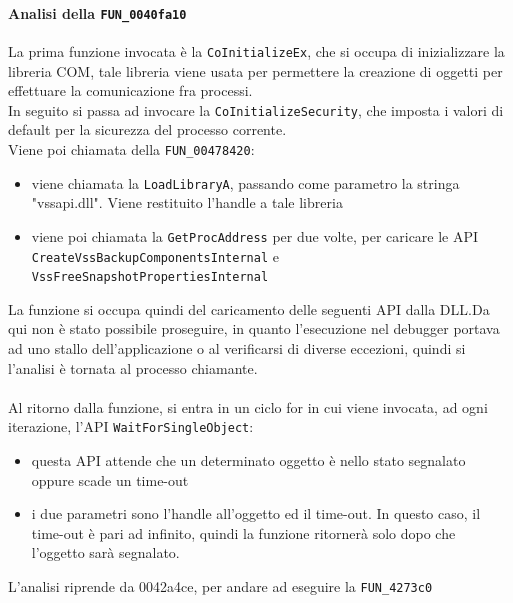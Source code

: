 \documentclass[12pt]{extarticle}
\begin{document}
\paragraph{Analisi della \texttt{FUN\_0040fa10}} La prima funzione invocata è la \texttt{CoInitializeEx}, che si occupa di inizializzare la libreria COM, tale libreria viene usata per permettere la creazione di oggetti per effettuare la comunicazione fra processi.\\In seguito si passa ad invocare la \texttt{CoInitializeSecurity}, che imposta i valori di default per la sicurezza del processo corrente.\\Viene poi chiamata della \texttt{FUN\_00478420}:
\begin{itemize}
    \item viene chiamata la \texttt{LoadLibraryA}, passando come parametro la stringa "vssapi.dll". Viene restituito l'handle a tale libreria
    \item viene poi chiamata la \texttt{GetProcAddress} per due volte, per caricare le API \\ \texttt{CreateVssBackupComponentsInternal} e \\ \texttt{VssFreeSnapshotPropertiesInternal}
\end{itemize}
La funzione si occupa quindi del caricamento delle seguenti API dalla DLL.Da qui non è stato possibile proseguire, in quanto l'esecuzione nel debugger portava ad uno stallo dell'applicazione o al verificarsi di diverse eccezioni, quindi si l'analisi è tornata al processo chiamante.\\\\

Al ritorno dalla funzione, si entra in un ciclo for in cui viene invocata, ad ogni iterazione, l'API \texttt{WaitForSingleObject}: 
\begin{itemize}
    \item questa API attende che un determinato oggetto è nello stato segnalato oppure scade un time-out 
    \item i due parametri sono l'handle all'oggetto ed il time-out. In questo caso, il time-out è pari ad infinito, quindi la funzione ritornerà solo dopo che l'oggetto sarà segnalato.
\end{itemize}
L'analisi riprende da 0042a4ce, per andare ad eseguire la \texttt{FUN\_4273c0}
\end{document}

